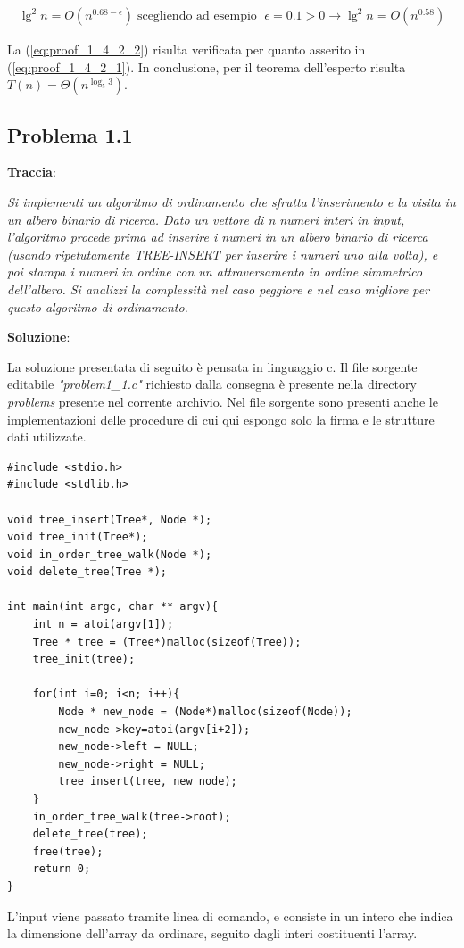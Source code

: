 \documentclass{article}
\begin{document}
\begin{equation} \label{eq:proof_1_4_2_2}
\begin{aligned}
\lg^2 n = O(n^{0.68 - \epsilon}) \; \text{scegliendo ad esempio } \; \epsilon = 0.1 > 0 \rightarrow \lg^2 n = O(n^{0.58})
\end{aligned}
\end{equation}

\noindent La (\ref{eq:proof_1_4_2_2}) risulta verificata per quanto asserito in (\ref{eq:proof_1_4_2_1}). In conclusione, per il teorema dell'esperto risulta $T(n) = \Theta(n^{\log_{5}{3}})$.


\subsection{Problema 1.1} \label{subsec:problema_1_1}
\textbf{Traccia}:

\noindent
\textit{Si implementi un algoritmo di ordinamento che sfrutta l'inserimento e la visita in un albero  binario di ricerca. Dato un vettore di n numeri interi in input, l'algoritmo procede prima ad 
inserire i numeri in un albero binario di ricerca (usando ripetutamente TREE-INSERT per inserire i numeri uno alla volta), e poi stampa i numeri in ordine con un attraversamento in ordine simmetrico dell'albero. Si analizzi la complessità nel caso peggiore e nel caso migliore per questo algoritmo di ordinamento.}

\vspace{2\baselineskip}
\noindent
\textbf{Soluzione}: 

\noindent
La soluzione presentata di seguito è pensata in linguaggio c. Il file sorgente editabile \textit{"problem1\_1.c"} richiesto dalla consegna è presente nella directory \textit{problems} presente nel corrente archivio. Nel file sorgente sono presenti anche le implementazioni delle procedure di cui qui espongo solo la firma e le strutture dati utilizzate.

\begin{lstlisting}
#include <stdio.h>
#include <stdlib.h>

void tree_insert(Tree*, Node *);
void tree_init(Tree*);
void in_order_tree_walk(Node *);
void delete_tree(Tree *);

int main(int argc, char ** argv){
    int n = atoi(argv[1]);
    Tree * tree = (Tree*)malloc(sizeof(Tree));
    tree_init(tree);

    for(int i=0; i<n; i++){
        Node * new_node = (Node*)malloc(sizeof(Node));
        new_node->key=atoi(argv[i+2]);
        new_node->left = NULL;
        new_node->right = NULL;
        tree_insert(tree, new_node);
    }
    in_order_tree_walk(tree->root);
    delete_tree(tree);
    free(tree);
    return 0;
}

\end{lstlisting}
\noindent
L'input viene passato tramite linea di comando, e consiste in un intero che indica la dimensione dell'array da ordinare, seguito dagli interi costituenti l'array.
\end{document}
